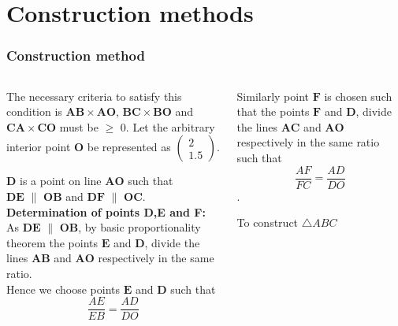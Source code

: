 \documentclass{beamer}
\renewcommand{\vec}[1]{\mathbf{#1}}
\begin{document}
\section*{Construction methods}
\begin{frame}[fragile]
\footnotesize
\frametitle{Construction method}
\begin{columns}
\begin{column}{0.5\textwidth}
    The necessary criteria to satisfy this condition is $\vec{AB} \times \vec{AO}$, $\vec{BC} \times \vec{BO}$  and $\vec{CA} \times \vec{CO}$ must be $\geqslant$ 0.
      Let the arbitrary interior point $\vec{O}$ be represented as $\begin{pmatrix}2\\1.5\end{pmatrix}$.\quad

    $\vec{D}$ is a point on line $\vec{AO}$ such that \\$\vec{DE}$ $\parallel$ $\vec{OB}$ \quad and \quad $\vec{DF}$  $\parallel$  $\vec{OC}$.\\

\textbf{Determination of points D,E and F:}\\

As $\vec{DE}$ $\parallel$ $\vec{OB}$, by basic proportionality theorem the points $\vec{E}$ and $\vec{D}$, divide the lines $\vec{AB}$ and $\vec{AO}$ respectively in the same ratio.\\ 
Hence we choose points $\vec{E}$ and $\vec{D}$ such that \begin{equation}\frac{AE}{EB} = \frac{AD}{DO}\end{equation} 

  \end{column}
 
 
\begin{column}{0.5\textwidth}   
\quad Similarly point $\vec{F}$ is chosen such that the points $\vec{F}$ and $\vec{D}$, divide the lines $\vec{AC}$ and $\vec{AO}$ respectively in the same ratio such that \begin{equation}\frac{AF}{FC} = \frac{AD}{DO}\end{equation}.\\
  

\begin{table}[ht]
    \begin{center}
    
    \caption{To construct $\triangle ABC$}
   \label{table:table2}
   \end{center}	
\end{table}

 
    
\end{column}
\end{columns}
\end{frame}
\end{document}
